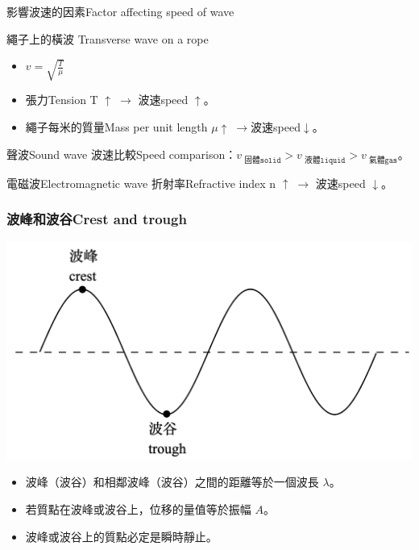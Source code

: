 \documentclass[beamer=true]{standalone}
\begin{document}
\begin{frame}{影響波速的因素Factor affecting speed of wave}

    \begin{exampleblock}{繩子上的橫波 Transverse wave on a rope}
        \begin{itemize}
            \setlength{\itemsep}{.6em}
            \item $\displaystyle v=\sqrt{\frac{T}{\mu}} $
            \item 張力Tension T $\uparrow \;\rightarrow$ 波速speed $\uparrow$。
            \item 繩子每米的質量Mass per unit length $\mu\uparrow \;\rightarrow$波速speed$\downarrow$。
        \end{itemize}
    \end{exampleblock}
    \begin{exampleblock}{聲波Sound wave}
        波速比較Speed comparison：$v_{\texttt{ 固體solid}}>v_{\texttt{ 液體liquid}}>v_{\texttt{ 氣體gas}}$。
    \end{exampleblock}

    \begin{exampleblock}{電磁波Electromagnetic wave}
        折射率Refractive index n $\uparrow \;\rightarrow$ 波速speed $\downarrow$。
    \end{exampleblock}
\end{frame}

\begin{frame}
    \frametitle{波峰和波谷Crest and trough}
    \par{\par\centering\includegraphics[width=.7\textwidth]{./img/ch1_2024-05-09-11-41-18.png}\par}
    \begin{itemize}
        \item 波峰（波谷）和相鄰波峰（波谷）之間的距離等於一個波長 $\lambda$。
        \item 若質點在波峰或波谷上，位移的量值等於振幅 $A$。
        \item 波峰或波谷上的質點必定是瞬時靜止。
    \end{itemize}
\end{frame}
\end{document}
